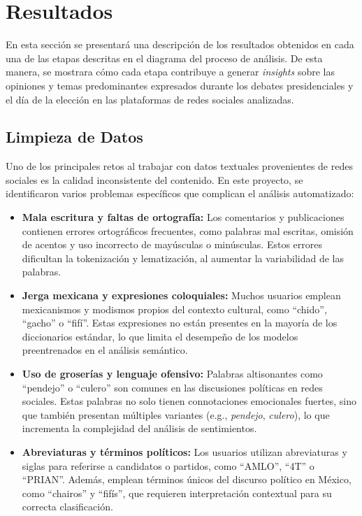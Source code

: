 \documentclass[10pt, a4paper]{article}
\begin{document}
	
	\section{Resultados}
	
	En esta sección se presentará una descripción de los resultados obtenidos en cada una de las etapas descritas en el diagrama del proceso de análisis. De esta manera, se mostrara cómo cada etapa contribuye a generar \textit{insights} sobre las opiniones y temas predominantes expresados durante los debates presidenciales y el día de la elección en las plataformas de redes sociales analizadas.
	
	\subsection{Limpieza de Datos}
	
	Uno de los principales retos al trabajar con datos textuales provenientes de redes sociales es la calidad inconsistente del contenido. En este proyecto, se identificaron varios problemas específicos que complican el análisis automatizado:
	
	\begin{itemize}
		\item \textbf{Mala escritura y faltas de ortografía:} Los comentarios y publicaciones contienen errores ortográficos frecuentes, como palabras mal escritas, omisión de acentos y uso incorrecto de mayúsculas o minúsculas. Estos errores dificultan la tokenización y lematización, al aumentar la variabilidad de las palabras.
		
		\item \textbf{Jerga mexicana y expresiones coloquiales:} Muchos usuarios emplean mexicanismos y modismos propios del contexto cultural, como “chido”, “gacho” o “fifí”. Estas expresiones no están presentes en la mayoría de los diccionarios estándar, lo que limita el desempeño de los modelos preentrenados en el análisis semántico.
		
		\item \textbf{Uso de groserías y lenguaje ofensivo:} Palabras altisonantes como “pendejo” o “culero” son comunes en las discusiones políticas en redes sociales. Estas palabras no solo tienen connotaciones emocionales fuertes, sino que también presentan múltiples variantes (e.g., \textit{pendejo}, \textit{culero}), lo que incrementa la complejidad del análisis de sentimientos.
		
		\item \textbf{Abreviaturas y términos políticos:} Los usuarios utilizan abreviaturas y siglas para referirse a candidatos o partidos, como “AMLO”, “4T” o “PRIAN”. Además, emplean términos únicos del discurso político en México, como “chairos” y “fifís”, que requieren interpretación contextual para su correcta clasificación.
		
	\end{itemize}
	
\end{document}
